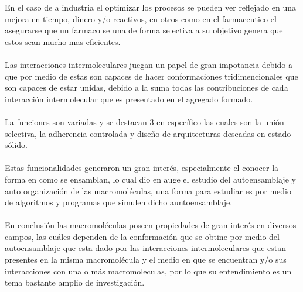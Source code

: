 \documentclass[10pt]{article}
\newcommand{\np}[1]{\paragraph{\normalfont{#1}}}
\begin{document}
    En el caso de a industria el optimizar los procesos se pueden ver reflejado en una mejora en tiempo, dinero y/o reactivos, en otros como en el farmaceutico el asegurarse que un farmaco se una de forma selectiva a su objetivo genera que estos sean mucho mas eficientes. \np{}

    Las interacciones intermoleculares juegan un papel de gran impotancia debido a que por medio de estas son capaces de hacer conformaciones tridimencionales que son capaces de estar unidas, debido a la suma todas las contribuciones de cada interacción intermolecular que es presentado en el agregado formado.\np{}

    La funciones son variadas y se destacan 3 en específico las cuales son la unión selectiva, la adherencia controlada y diseño de arquitecturas deseadas en estado sólido.\np{}

    Estas funcionalidades generaron un gran interés, especialmente el conocer la forma en como se ensamblan, lo cual dio en auge el estudio del autoensamblaje y auto organización de las macromoléculas, una forma para estudiar es por medio de algoritmos y programas que simulen dicho auntoensamblaje.\np{}

    En conclusión las macromoléculas poseen propiedades de gran interés en diversos campos, las cuáles dependen de la conformación que se obtine por medio del autoensamblaje que esta dado por las interacciones intermoleculares que estan presentes en la misma macromolécula y el medio en que se encuentran y/o sus interacciones con una o más macromoleculas, por lo que su entendimiento es un tema bastante amplio de investigación.\np{}


    
    

\end{document}
